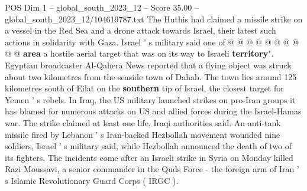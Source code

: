 \begin{textsample}{POS Dim 1 – global\_south\_2023\_12 – Score 35.00 – global\_south\_2023\_12/104619787.txt}
The Huthis had claimed a missile strike on a vessel in the Red Sea and a drone attack towards Israel, their latest such actions in solidarity with Gaza.
Israel ' s military said one of @ @ @ @ @ @ @ @ @ @ \textbf{area} a hostile aerial target that was on its way to Israeli \textbf{territory}".
Egyptian broadcaster Al-Qahera News reported that a flying object was struck about two kilometres from the seaside town of Dahab.
The town lies around 125 kilometres south of Eilat on the \textbf{southern} tip of Israel, the closest target for Yemen ' s rebels.
In Iraq, the US military launched strikes on pro-Iran groups it has blamed for numerous attacks on US and allied forces during the Israel-Hamas war.
The strike claimed at least one life, Iraqi authorities said.
An anti-tank missile fired by Lebanon ' s Iran-backed Hezbollah movement wounded nine soldiers, Israel ' s military said, while Hezbollah announced the death of two of its fighters.
The incidents come after an Israeli strike in Syria on Monday killed Razi Moussavi, a senior commander in the Quds Force - the foreign arm of Iran ' s Islamic Revolutionary Guard Corps ( IRGC ).

\end{textsample}
